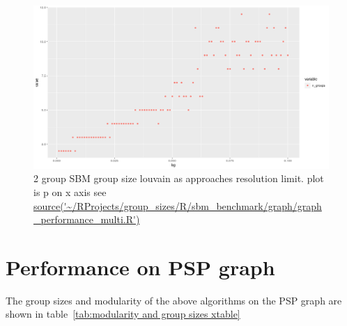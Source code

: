 \begin{figure}
    \centering
    \includegraphics[width=\textwidth]{images/Rplot_group_size_rough_louvain_sbm.png}
    \caption{2 group SBM group size louvain as approaches resolution limit. plot is p on x axis see \url{source('~/RProjects/group_sizes/R/sbm_benchmark/graph/graph_performance_multi.R')}}
    \label{fig:my_rough_louvain group size}
\end{figure}

\section{Performance on PSP graph}

The group sizes and modularity of the above algorithms on the PSP graph are shown in table~\ref{tab:modularity and group sizes xtable}

